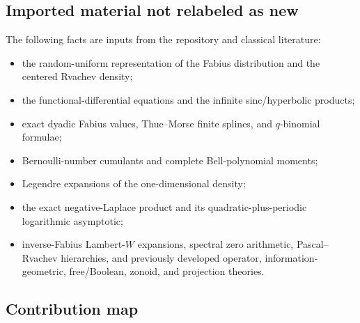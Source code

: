 \documentclass[11pt,oneside]{article}
\theoremstyle{definition}
\theoremstyle{remark}
\begin{document}
\subsection{Imported material not relabeled as new}

The following facts are inputs from the repository and classical literature:
\begin{itemize}
\item the random-uniform representation of the Fabius distribution and the
      centered Rvachev density;
\item the functional-differential equations and the infinite sinc/hyperbolic
      products;
\item exact dyadic Fabius values, Thue--Morse finite splines, and
      $q$-binomial formulae;
\item Bernoulli-number cumulants and complete Bell-polynomial moments;
\item Legendre expansions of the one-dimensional density;
\item the exact negative-Laplace product and its quadratic-plus-periodic
      logarithmic asymptotic;
\item inverse-Fabius Lambert-$W$ expansions, spectral zero arithmetic,
      Pascal--Rvachev hierarchies, and previously developed operator,
      information-geometric, free/Boolean, zonoid, and projection theories.
\end{itemize}

\subsection{Contribution map}
\end{document}
